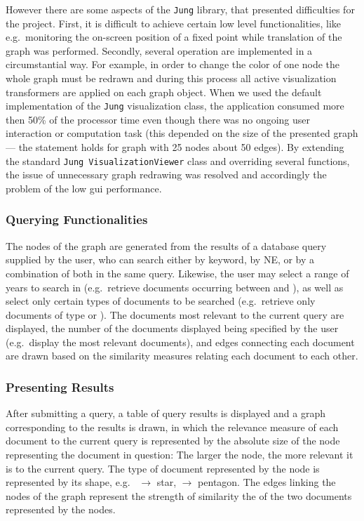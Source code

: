 However there are some aspects of the \texttt{Jung} library, that presented difficulties for the project.
First, it is difficult to achieve certain low level functionalities, like e.g.\ monitoring the
on-screen position of a fixed point while translation of the graph was performed. Secondly, several
operation are implemented in a circumstantial way. For example, in order to change the color of
one node the whole graph must be redrawn and during this process all active visualization
transformers are applied on each graph object. When we used the default implementation of the
\texttt{Jung} visualization class, the application consumed more then 50\% of the processor time
even though there was no ongoing user interaction or computation task (this depended on the size of
the presented graph --- the statement holds for graph with 25 nodes about 50 edges). By extending
the standard \texttt{Jung VisualizationViewer} class and overriding several functions, the issue of
unnecessary graph redrawing was resolved and accordingly the problem of the low gui performance.

\subsubsection {Querying Functionalities}
\label{sec:querying_functionalities}
The nodes of the graph are generated from the results of a database query supplied by the user, who
can search either by keyword, by NE, or by a combination of both in the same query. Likewise, the
user may select a range of years to search in (e.g.\ retrieve documents occurring between
 and ), as well as select only certain types of documents to be searched
(e.g.\ retrieve only documents of type  or ). The documents most
relevant to the current query are displayed, the number of the documents displayed being specified
by the user (e.g.\ display the  most relevant documents), and edges connecting each
document are drawn based on the similarity measures relating each document to each other.

\subsubsection {Presenting Results}
\label{sec:presenting_results}
After submitting a query, a table of query results is displayed and a graph corresponding to the
results is drawn, in which the relevance measure of each document to the current query is
represented by the absolute size of the node representing the document in question: The larger the
node, the more relevant it is to the current query. The type of document represented by the node is
represented by its shape, e.g.\  $\rightarrow$ star,  $\rightarrow$
pentagon. The edges linking the nodes of the graph represent the strength of similarity the of the
two documents represented by the nodes.
